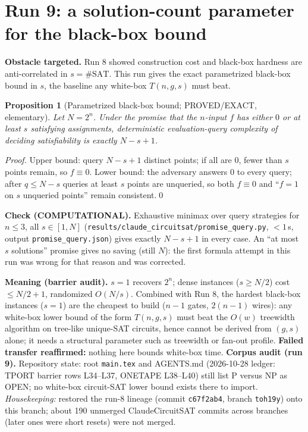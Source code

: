 \documentclass[11pt]{article}
\newtheorem{prop}{Proposition}
\begin{document}
\section{Run 9: a solution-count parameter for the black-box bound}\label{sec:r9}
\textbf{Obstacle targeted.} Run 8 showed construction cost and black-box hardness are anti-correlated in $s=\#\mathrm{SAT}$. This run gives the exact parametrized black-box bound in $s$, the baseline any white-box $T(n,g,s)$ must beat.
\begin{prop}[Parametrized black-box bound; PROVED/EXACT, elementary] Let $N=2^n$. Under the promise that the $n$-input $f$ has either $0$ or at least $s$ satisfying assignments, deterministic evaluation-query complexity of deciding satisfiability is exactly $N-s+1$.
\end{prop}
\emph{Proof.} Upper bound: query $N-s+1$ distinct points; if all are $0$, fewer than $s$ points remain, so $f\equiv0$. Lower bound: the adversary answers $0$ to every query; after $q\le N-s$ queries at least $s$ points are unqueried, so both $f\equiv 0$ and ``$f=1$ on $s$ unqueried points'' remain consistent.\qed

\textbf{Check (COMPUTATIONAL).} Exhaustive minimax over query strategies for $n\le3$, all $s\in[1,N]$ (\texttt{results/claude\_circuitsat/promise\_query.py}, $<1$\,s, output \texttt{promise\_query.json}) gives exactly $N-s+1$ in every case. An ``at most $s$ solutions'' promise gives no saving (still $N$): the first formula attempt in this run was wrong for that reason and was corrected.

\textbf{Meaning (barrier audit).} $s=1$ recovers $2^n$; dense instances ($s\ge N/2$) cost $\le N/2+1$, randomized $O(N/s)$. Combined with Run 8, the hardest black-box instances ($s=1$) are the cheapest to build ($n-1$ gates, $2(n-1)$ wires): any white-box lower bound of the form $T(n,g,s)$ must beat the $O(w)$ treewidth algorithm on tree-like unique-SAT circuits, hence cannot be derived from $(g,s)$ alone; it needs a structural parameter such as treewidth or fan-out profile. \textbf{Failed transfer reaffirmed:} nothing here bounds white-box time. \textbf{Corpus audit (run 9).} Repository state: root \texttt{main.tex} and AGENTS.md (2026-10-28 ledger: TPORT barrier rows L34--L37, ONETAPE L38--L40) still list P versus NP as OPEN; no white-box circuit-SAT lower bound exists there to import. \emph{Housekeeping:} restored the run-8 lineage (commit \texttt{c67f2ab4}, branch \texttt{toh19y}) onto this branch; about 190 unmerged ClaudeCircuitSAT commits across branches (later ones were short resets) were not merged.
\end{document}
